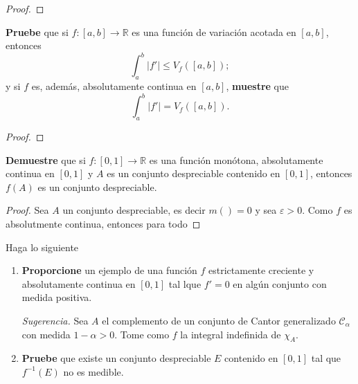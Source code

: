 \documentclass[12pt]{report}
\theoremstyle{largebreak}
\newcommand\abs[1]{\ensuremath{\lvert#1\rvert}}
\newcommand\cf[3]{\ensuremath{#1:#2\rightarrow#3}}
\begin{document}
    \begin{proof}
        
    \end{proof}

    \begin{excer}
        \textbf{Pruebe} que si $\cf{f}{[a,b]}{\mathbb{R}}$ es una función de variación acotada en $[a,b]$, entonces
        \begin{equation*}
            \int_{a}^{b}\abs{f'}\leq V_f([a,b]);
        \end{equation*}
        y si $f$ es, además, absolutamente continua en $[a,b]$, \textbf{muestre} que
        \begin{equation*}
            \int_{a}^{b}\abs{f'}=V_f([a,b]).
        \end{equation*}
    \end{excer}

    \begin{proof}
        
    \end{proof}

    \begin{excer}
        \textbf{Demuestre} que si $\cf{f}{[0,1]}{\mathbb{R}}$ es una función monótona, absolutamente continua en $[0,1]$ y $A$ es un conjunto despreciable contenido en $[0,1]$, entonces $f(A)$ es un conjunto despreciable.
    \end{excer}

    \begin{proof}
        Sea $A$ un conjunto despreciable, es decir $m\left(\right)=0$ y sea $\varepsilon>0$. Como $f$ es absolutmente continua, entonces para todo
    \end{proof}

    \begin{excer}
        Haga lo siguiente
        \begin{enumerate}
            \item \textbf{Proporcione} un ejemplo de una función $f$ estrictamente creciente y absolutamente continua en $[0,1]$ tal lque $f'=0$ en algún conjunto con medida positiva.
            
            \textit{Sugerencia.} Sea $A$ el complemento de un conjunto de Cantor generalizado $\mathscr{C}_\alpha$ con medida $1-\alpha>0$. Tome como $f$ la integral indefinida de $\chi_A$.
            \item \textbf{Pruebe} que existe un conjunto despreciable $E$ contenido en $[0,1]$ tal que $f^{-1}(E)$ no es medible.
        \end{enumerate}
    \end{excer}
\end{document}
